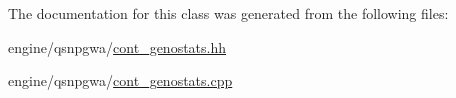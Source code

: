 The documentation for this class was generated from the following files:\begin{DoxyCompactItemize}
\item 
engine/qsnpgwa/\hyperlink{cont__genostats_8hh}{cont\_\-genostats.hh}\item 
engine/qsnpgwa/\hyperlink{cont__genostats_8cpp}{cont\_\-genostats.cpp}\end{DoxyCompactItemize}
